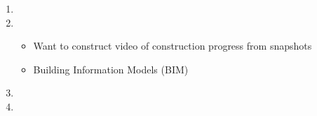 \documentclass[12pt]{article}
\begin{document}
\begin{enumerate}
\item {}

\item {}
\begin{itemize}
	\item Want to construct video of construction progress from snapshots
	\item Building Information Models (BIM) 
\end{itemize}

\item {}

\item {}


\end{enumerate}
\end{document}
